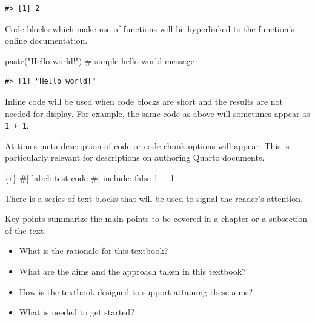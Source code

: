 \documentclass[
  letterpaper,
]{latex/krantz}
\newenvironment{Shaded}{\begin{snugshade}}{\end{snugshade}}
\newcommand{\CommentTok}[1]{\textcolor[rgb]{0.37,0.37,0.37}{#1}}
\newcommand{\DecValTok}[1]{\textcolor[rgb]{0.68,0.00,0.00}{#1}}
\newcommand{\FunctionTok}[1]{\textcolor[rgb]{0.28,0.35,0.67}{#1}}
\newcommand{\InformationTok}[1]{\textcolor[rgb]{0.37,0.37,0.37}{#1}}
\newcommand{\NormalTok}[1]{\textcolor[rgb]{0.00,0.23,0.31}{#1}}
\newcommand{\SpecialCharTok}[1]{\textcolor[rgb]{0.37,0.37,0.37}{#1}}
\newcommand{\StringTok}[1]{\textcolor[rgb]{0.13,0.47,0.30}{#1}}
\providecommand{\tightlist}{%
  \setlength{\itemsep}{0pt}\setlength{\parskip}{0pt}}\usepackage{longtable,booktabs,array}
\begin{document}
\begin{verbatim}
#> [1] 2
\end{verbatim}

Code blocks which make use of functions will be hyperlinked to the
function's online documentation.

\begin{Shaded}
\begin{Highlighting}[]
\FunctionTok{paste}\NormalTok{(}\StringTok{"Hello world!"}\NormalTok{) }\CommentTok{\# simple \textquotesingle{}hello world\textquotesingle{} message}
\end{Highlighting}
\end{Shaded}

\begin{verbatim}
#> [1] "Hello world!"
\end{verbatim}

Inline code will be used when code blocks are short and the results are
not needed for display. For example, the same code as above will
sometimes appear as \texttt{1\ +\ 1}.

At times meta-description of code or code chunk options will appear.
This is particularly relevant for descriptions on authoring Quarto
documents.

\begin{Shaded}
\begin{Highlighting}[]
\InformationTok{\textasciigrave{}\textasciigrave{}\textasciigrave{}\{r\}}
\CommentTok{\#| label: test{-}code }
\CommentTok{\#| include: false}
\DecValTok{1} \SpecialCharTok{+} \DecValTok{1}
\InformationTok{\textasciigrave{}\textasciigrave{}\textasciigrave{}}
\end{Highlighting}
\end{Shaded}

There is a series of text blocks that will be used to signal the
reader's attention.

Key points summarize the main points to be covered in a chapter or a
subsection of the text.

\begin{tcolorbox}[enhanced jigsaw, opacitybacktitle=0.6, breakable, colframe=quarto-callout-note-color-frame, arc=.35mm, left=2mm, leftrule=.75mm, title=\textcolor{quarto-callout-note-color}{\faInfo}\hspace{0.5em}{Keys}, opacityback=0, colback=white, toptitle=1mm, rightrule=.15mm, titlerule=0mm, bottomtitle=1mm, bottomrule=.15mm, coltitle=black, colbacktitle=quarto-callout-note-color!10!white, toprule=.15mm]

\begin{itemize}
\tightlist
\item
  What is the rationale for this textbook?
\item
  What are the aims and the approach taken in this textbook?
\item
  How is the textbook designed to support attaining these aims?
\item
  What is needed to get started?
\end{itemize}

\end{tcolorbox}
\end{document}
